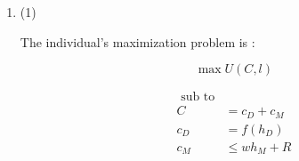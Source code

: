 \documentclass{jsarticle}
\begin{document}
\begin{enumerate}
 (3)
 
 By the conditional demand function obtained in (3), $\bar{L_a}(w_a,w_b,\bar{y})$ is decreasing in $w_a$, while $\bar{L_b}(w_a,w_b,\bar{y})$ increasing in $w_a$, since $\bar{y}, A >0$, $\left( \dfrac{w_b}{w_a} \right) > 0$ and $\left( \dfrac{w_a}{w_b} \right)>0$ for any positive $w_a$ and $w_b$.
 
 Thus, for $\bar{w_a} > w_a$,
 
  \begin{align*}
  \bar{L_a}(\bar{w_a}, w_b, \bar{y}) &< \bar{L_a}(w_a, w_b, \bar{y}) \\
  \bar{L_b}(\bar{w_a}, w_b, \bar{y}) & >\bar{L_b}(w_a, w_b, \bar{y})
  \end{align*}
 
 (4)
 
 Planner's profit maximization problem is :
 
  \begin{align*}
  \max_{y} \Pi(y) &= p(y) \cdot y - w_a L_a - w_b L_b \\
  &= y^{\frac{1+\beta}{\beta}} - \dfrac{2y}{A} w_a^{\alpha} w_b^{1-\alpha} 
  \end{align*} 
 
 FOC yields
 
  \begin{align*}
  \dfrac{1+\beta}{\beta} y^{\dfrac{1}{\beta}} - \dfrac{2}{A} w_a^{\alpha} w_b^{1-\alpha} &=0 \\
  y^{\dfrac{1}{\beta}} &= \dfrac{2\beta}{A(1+\beta)}w_a^{\alpha} w_b^{1-\alpha} \\
  y^* (w_a, w_b) &= \left[ \dfrac{2\beta}{A(1+\beta)}w_a^{\alpha} w_b^{1-\alpha} \right]^{\beta}
  \end{align*}
 
 (5)
 
 When $y$ is normal goods, $p(y)$ should be decreasing in $y$. Also, by the optimal output obtained in (4), It is required that $\beta < -1$ or $\beta \geq 0$, for y being positive value. So, I assume that $\beta < -1$.
 
 Then, 
 
 \item
 
 (1)
 
 The individual's maximization problem is :
 
 \[ \max U(C,l) \]
 
  \begin{align*}
  \text{ sub to} \\
  C &= c_D + c_M \\
  c_D &= f(h_D) \\
  c_M & \leq w h_M + R
  \end{align*}
 

\end{enumerate}
\end{document}
